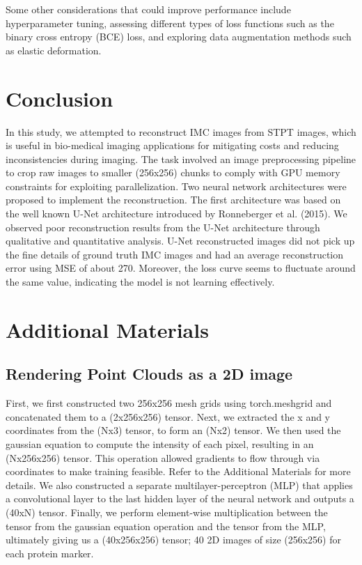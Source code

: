 \documentclass[10pt,twocolumn,letterpaper]{article}
\begin{document}
Some other considerations that could improve performance include hyperparameter tuning, assessing different types of loss functions such as the binary cross entropy (BCE) loss, and exploring data augmentation methods such as elastic deformation.

\section{Conclusion}
In this study, we attempted to reconstruct IMC images from STPT images, which is useful in bio-medical imaging applications for mitigating costs and reducing inconsistencies during imaging. The task involved an image preprocessing pipeline to crop raw images to smaller (256x256) chunks to comply with GPU memory constraints for exploiting parallelization. Two neural network architectures were proposed to implement the reconstruction. The first architecture was based on the well known U-Net architecture introduced by Ronneberger et al. (2015). We observed poor reconstruction results from the U-Net architecture through qualitative and quantitative analysis. U-Net reconstructed images did not pick up the fine details of ground truth IMC images and had an average reconstruction error using MSE of about 270. Moreover, the loss curve seems to fluctuate around the same value, indicating the model is not learning effectively. 
\pagebreak

\section{Additional Materials}
\subsection{Rendering Point Clouds as a 2D image}
First, we first constructed two 256x256 mesh grids using torch.meshgrid and concatenated them to a (2x256x256) tensor. Next, we extracted the x and y coordinates from the (Nx3) tensor, to form an (Nx2) tensor. We then used the gaussian equation to compute the intensity of each pixel, resulting in an (Nx256x256) tensor. This operation allowed gradients to flow through via coordinates to make training feasible. Refer to the Additional Materials for more details. We also constructed a separate multilayer-perceptron (MLP) that applies a convolutional layer to the last hidden layer of the neural network and outputs a (40xN) tensor. Finally, we perform element-wise multiplication between the tensor from the gaussian equation operation and the tensor from the MLP, ultimately giving us a (40x256x256) tensor; 40 2D images of size (256x256) for each protein marker. 
\end{document}
